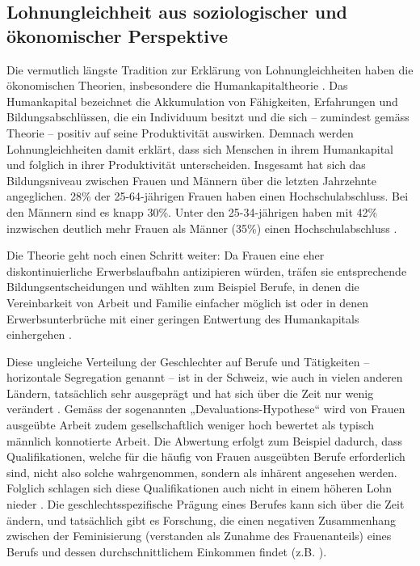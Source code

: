 \documentclass[a4paper,12pt]{article}
\renewcommand{\baselinestretch}{1.1}
\newif\ifcomments
\newcommand{\comment}[1]{%
    \ifcomments\marginpar{\renewcommand{\baselinestretch}{1}\tiny\hspace*{-1.1em}\colorbox{gray!20}%
    {\textcolor{red}{\parbox[t]{.9in}{\raggedright #1}}}}\fi}
\begin{document}
\subsection{Lohnungleichheit aus soziologischer und ökonomischer Perspektive}
\comment{Bei den englischen Begriffen auf Gross-Kleinschreibung achten}

Die vermutlich längste Tradition zur Erklärung von Lohnungleichheiten haben die
ökonomischen Theorien, insbesondere die Humankapitaltheorie \citep{Becker-1975,
Mincer-1958,Mincer-Polachek-1974}. Das Humankapital bezeichnet die Akkumulation
von Fähigkeiten, Erfahrungen und Bildungsabschlüssen, die ein Individuum
besitzt und die sich -- zumindest gemäss Theorie -- positiv auf seine
Produktivität auswirken. Demnach werden Lohnungleichheiten damit erklärt, dass
sich Menschen in ihrem Humankapital und folglich in ihrer Produktivität
unterscheiden. 
Insgesamt hat sich das Bildungsniveau zwischen Frauen und Männern über die letzten Jahrzehnte angeglichen. 28\% der 25-64-jährigen Frauen haben einen Hochschulabschluss. Bei den Männern sind es knapp 30\%. Unter den 25-34-jährigen haben mit 42\% inzwischen deutlich mehr Frauen als Männer (35\%) einen Hochschulabschluss \citep{BFS-2019b}. 

Die Theorie geht noch einen Schritt weiter: Da Frauen eine eher
diskontinuierliche Erwerbslaufbahn antizipieren würden, träfen sie entsprechende
Bildungsentscheidungen und wählten zum Beispiel Berufe, in denen die
Vereinbarkeit von Arbeit und Familie einfacher möglich ist oder in denen
Erwerbsunterbrüche mit einer geringen Entwertung des Humankapitals einhergehen
\citep{Polachek-1981}.

\comment{diesen Abschnitt in den Theorieteil?}
Diese ungleiche Verteilung der Geschlechter auf Berufe und Tätigkeiten -- horizontale Segregation genannt -- ist in der Schweiz, wie auch in vielen anderen Ländern, tatsächlich sehr ausgeprägt und hat sich über die Zeit nur wenig verändert \citep{Buchmann-Kriesi-2012,Charles-2005,Schwiter-etal-2014}.
Gemäss der sogenannten „Devaluations-Hypothese“
\citep{England-etal-1988,Liebeskind-2004} wird von Frauen ausgeübte Arbeit zudem 
gesellschaftlich weniger hoch bewertet als typisch männlich konnotierte Arbeit. Die
Abwertung erfolgt zum Beispiel dadurch, dass Qualifikationen, welche für die
häufig von Frauen ausgeübten Berufe erforderlich sind, nicht also solche
wahrgenommen, sondern als inhärent angesehen werden. Folglich schlagen sich
diese Qualifikationen auch nicht in einem höheren Lohn nieder
\citep{England-1992,England-2005,Gottschall-1995}. Die geschlechtsspezifische
Prägung eines Berufes kann sich über die Zeit ändern, und tatsächlich gibt es
Forschung, die einen negativen Zusammenhang zwischen der Feminisierung
(verstanden als Zunahme des Frauenanteils) eines Berufs und dessen
durchschnittlichem Einkommen findet (z.B.
\citealp{Levanon-etal-2009,Murphy-Oesch-2016}).
\end{document}
